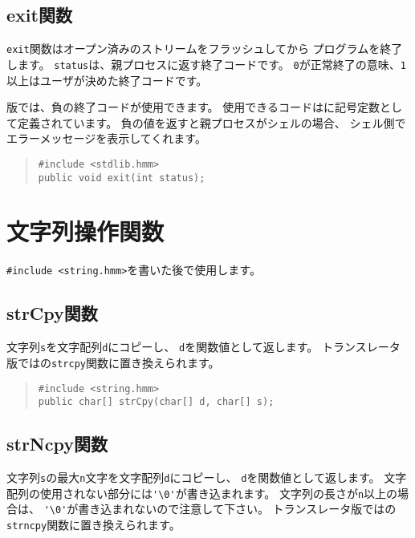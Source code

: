 \subsection{exit関数}

\verb/exit/関数はオープン済みのストリームをフラッシュしてから
プログラムを終了します。
\verb/status/は、親プロセスに返す終了コードです。
\verb/0/が正常終了の意味、\verb/1/以上はユーザが決めた終了コードです。

{\tacos}版では、負の終了コードが使用できます。
使用できるコードはに記号定数として定義されています。
負の値を返すと親プロセスがシェルの場合、
シェル側でエラーメッセージを表示してくれます。

\begin{quote}
\begin{verbatim}
#include <stdlib.hmm>
public void exit(int status);
\end{verbatim}
\end{quote}

\section{文字列操作関数}

\verb/#include <string.hmm>/を書いた後で使用します。

\subsection{strCpy関数}

文字列\verb/s/を文字配列\verb/d/にコピーし、
\verb/d/を関数値として返します。
トランスレータ版では\cl の\verb/strcpy/関数に置き換えられます。

\begin{quote}
\begin{verbatim}
#include <string.hmm>
public char[] strCpy(char[] d, char[] s);
\end{verbatim}
\end{quote}

\subsection{strNcpy関数}

文字列\verb/s/の最大\verb/n/文字を文字配列\verb/d/にコピーし、
\verb/d/を関数値として返します。
文字配列の使用されない部分には\verb/'\0'/が書き込まれます。
文字列の長さが\verb/n/以上の場合は、
\verb/'\0'/が書き込まれないので注意して下さい。
トランスレータ版では\cl の\verb/strncpy/関数に置き換えられます。


